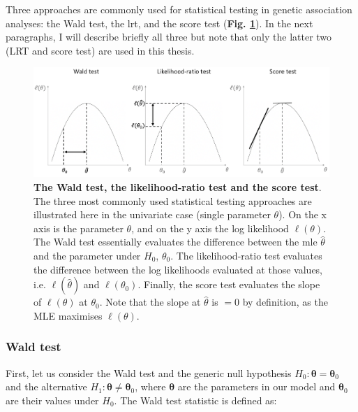 
\vspace{5mm}

Three approaches are commonly used for statistical testing in genetic association analyses: the Wald test, the \gls{lrt}, and the score test (\textbf{Fig. \ref{fig:hypothesis_tests}}).
In the next paragraphs, I will describe briefly all three but note that only the latter two (LRT and score test) are used in this thesis.

\begin{figure}[h]
\centering
\includegraphics[width=15cm]{Chapter2/Fig/wald_lrt_score_tests.png}
\caption[Wald, LRT and score test]{\textbf{The Wald test, the likelihood-ratio test and the score test}.\\
The three most commonly used statistical testing approaches are illustrated here in the univariate case (single parameter $\theta$). 
On the x axis is the parameter $\theta$, and on the y axis the log likelihood $\ell(\theta)$.
The Wald test essentially evaluates the difference between the \gls{mle} $\hat{\theta}$ and the parameter under $H_0$, $\theta_0$.
The likelihood-ratio test evaluates the difference between the log likelihoods evaluated at those values, i.e. $\ell(\hat{\theta})$ and $\ell(\theta_0)$.
Finally, the score test evaluates the slope of $\ell(\theta)$ at $\theta_0$. Note that the slope at $\hat{\theta}$ is $=0$ by definition, as the MLE maximises $\ell(\theta)$.}
\label{fig:hypothesis_tests}
\end{figure}

\newpage

\subsubsection{Wald test}

First, let us consider the Wald test and the generic null hypothesis $H_0: \boldsymbol{\theta} = \boldsymbol{\theta}_0$ and the alternative $H_1: \boldsymbol{\theta} \neq \boldsymbol{\theta}_0$, where $\boldsymbol{\theta}$ are the parameters in our model and $\boldsymbol{\theta}_0$ are their values under $H_0$.
The Wald test statistic is defined as:

